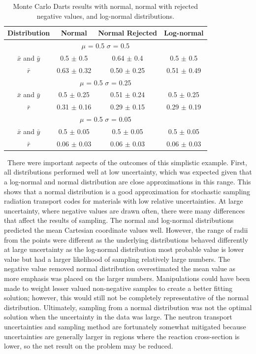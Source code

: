 \begin{table}[htb!]
	\setlength\extrarowheight{2.5pt}
	\centering
	\caption{Monte Carlo Darts results with normal, normal with rejected negative values, and log-normal distributions.}
	\label{table:MCDarts}
	\begin{tabular}{|c|c|c|c|}
		\hline
		Distribution & Normal & Normal Rejected & Log-normal \\ \hline
		\multicolumn{4}{|c|}{$\mu$ = 0.5 $\sigma$ = 0.5} \\ \hline
		$\bar{x}$ and $\bar{y}$ & 0.5 $\pm$ 0.5 & 0.64 $\pm$ 0.4 & 0.5 $\pm$ 0.5 \\ \hline
		$\bar{r}$ & 0.63 $\pm$ 0.32 & 0.50 $\pm$ 0.25 & 0.51 $\pm$ 0.49 \\ \hline
		\multicolumn{4}{|c|}{$\mu$ = 0.5 $\sigma$ = 0.25} \\ \hline
		$\bar{x}$ and $\bar{y}$ & 0.5 $\pm$ 0.25 & 0.51 $\pm$ 0.24 & 0.5 $\pm$ 0.25 \\ \hline
		$\bar{r}$ & 0.31 $\pm$ 0.16 & 0.29 $\pm$ 0.15 & 0.29 $\pm$ 0.19 \\ \hline
		\multicolumn{4}{|c|}{$\mu$ = 0.5 $\sigma$ = 0.05} \\ \hline
		$\bar{x}$ and $\bar{y}$ & 0.5 $\pm$ 0.05 & 0.5 $\pm$ 0.05 & 0.5 $\pm$ 0.05 \\ \hline
		$\bar{r}$ & 0.06 $\pm$ 0.03 & 0.06 $\pm$ 0.03 & 0.06 $\pm$ 0.03 \\ \hline
	\end{tabular}
\end{table}

\ There were important aspects of the outcomes of this simplistic example. 
First, all distributions performed well at low uncertainty, which was expected given that a log-normal and normal distribution are close approximations in this range. 
This shows that a normal distribution is a good approximation for stochastic sampling radiation transport codes for materials with low relative uncertainties. 
At large uncertainty, where negative values are drawn often, there were many differences that affect the results of sampling. 
The normal and log-normal distributions predicted the mean Cartesian coordinate values well.
However, the range of radii from the points were different as the underlying distributions behaved differently at large uncertainty as the log-normal distribution most probable value is lower value but had a larger likelihood of sampling relatively large numbers. 
The negative value removed normal distribution overestimated the mean value as more emphasis was placed on the larger numbers.
Manipulations could have been made to weight lesser valued non-negative samples to create a better fitting solution; however, this would still not be completely representative of the normal distribution. 
Ultimately, sampling from a normal distribution was not the optimal solution when the uncertainty in the data was large. 
The neutron transport uncertainties and sampling method are fortunately somewhat mitigated because uncertainties are generally larger in regions where the reaction cross-section is lower, so the net result on the problem may be reduced. 

